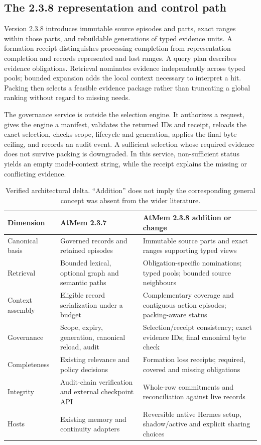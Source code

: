 \documentclass[10pt,twocolumn]{article}
\begin{document}
\subsection{The 2.3.8 representation and control path}
Version 2.3.8 introduces immutable source episodes and parts, exact ranges within those parts, and rebuildable generations of typed evidence units. A formation receipt distinguishes processing completion from representation completion and records represented and lost ranges. A query plan describes evidence obligations. Retrieval nominates evidence independently across typed pools; bounded expansion adds the local context necessary to interpret a hit. Packing then selects a feasible evidence package rather than truncating a global ranking without regard to missing needs.

The governance service is outside the selection engine. It authorizes a request, gives the engine a manifest, validates the returned IDs and receipt, reloads the exact selection, checks scope, lifecycle and generation, applies the final byte ceiling, and records an audit event. A sufficient selection whose required evidence does not survive packing is downgraded. In this service, non-sufficient status yields an empty model-context string, while the receipt explains the missing or conflicting evidence.

\begin{table}[t]
\centering\small
\begin{tabularx}{\linewidth}{p{.17\linewidth}YY}
\toprule
Dimension & AtMem 2.3.7 & AtMem 2.3.8 addition or change\\\midrule
Canonical basis & Governed records and retained episodes & Immutable source parts and exact ranges supporting typed views\\
Retrieval & Bounded lexical, optional graph and semantic paths & Obligation-specific nominations; typed pools; bounded source neighbours\\
Context assembly & Eligible record serialization under a budget & Complementary coverage and contiguous action episodes; packing-aware status\\
Governance & Scope, expiry, generation, canonical reload, audit & Selection/receipt consistency; exact evidence IDs; final canonical byte check\\
Completeness & Existing relevance and policy decisions & Formation loss receipts; required, covered and missing obligations\\
Integrity & Audit-chain verification and external checkpoint API & Whole-row commitments and reconciliation against live records\\
Hosts & Existing memory and continuity adapters & Reversible native Hermes setup, shadow/active and explicit sharing choices\\\bottomrule
\end{tabularx}
\caption{Verified architectural delta. ``Addition'' does not imply the corresponding general concept was absent from the wider literature.}
\label{tab:delta}
\end{table}
\end{document}
